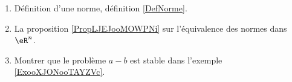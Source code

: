 
    \begin{enumerate}
        \item
            Définition d'une norme, définition \ref{DefNorme}.
\item
    La proposition \ref{PropLJEJooMOWPNi} sur l'équivalence des normes dans \( \eR^n\).
\item
    Montrer que le problème \( a-b\) est stable dans l'exemple \ref{ExooXJONooTAYZVc}.
\end{enumerate}

